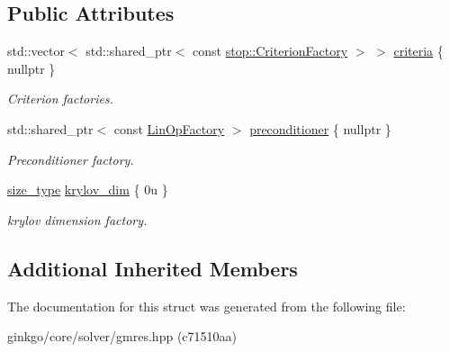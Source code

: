 \subsection*{Public Attributes}
\begin{DoxyCompactItemize}
\item 
\mbox{\label{structgko_1_1solver_1_1Gmres_1_1parameters__type_a7e00d428588b7bcac078083cb03c56c2}} 
std\+::vector$<$ std\+::shared\+\_\+ptr$<$ const \hyperlink{namespacegko_1_1stop_ab12a51109c50b35ec36dc5a393d6a9a0}{stop\+::\+Criterion\+Factory} $>$ $>$ \hyperlink{structgko_1_1solver_1_1Gmres_1_1parameters__type_a7e00d428588b7bcac078083cb03c56c2}{criteria} \{ nullptr \}
\begin{DoxyCompactList}\small\item\em Criterion factories. \end{DoxyCompactList}\item 
\mbox{\label{structgko_1_1solver_1_1Gmres_1_1parameters__type_ae20afde8c9429953030e86efd37b0953}} 
std\+::shared\+\_\+ptr$<$ const \hyperlink{classgko_1_1LinOpFactory}{Lin\+Op\+Factory} $>$ \hyperlink{structgko_1_1solver_1_1Gmres_1_1parameters__type_ae20afde8c9429953030e86efd37b0953}{preconditioner} \{ nullptr \}
\begin{DoxyCompactList}\small\item\em Preconditioner factory. \end{DoxyCompactList}\item 
\mbox{\label{structgko_1_1solver_1_1Gmres_1_1parameters__type_a5b88f3758ea7c21c535041289e1b09ce}} 
\hyperlink{namespacegko_a6e5c95df0ae4e47aab2f604a22d98ee7}{size\+\_\+type} \hyperlink{structgko_1_1solver_1_1Gmres_1_1parameters__type_a5b88f3758ea7c21c535041289e1b09ce}{krylov\+\_\+dim} \{ 0u \}
\begin{DoxyCompactList}\small\item\em krylov dimension factory. \end{DoxyCompactList}\end{DoxyCompactItemize}
\subsection*{Additional Inherited Members}


The documentation for this struct was generated from the following file\+:\begin{DoxyCompactItemize}
\item 
ginkgo/core/solver/gmres.\+hpp (c71510aa)\end{DoxyCompactItemize}
